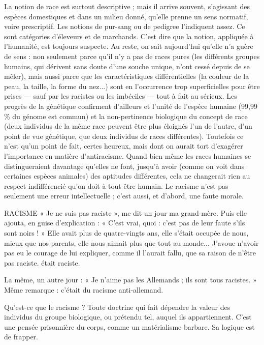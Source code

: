 La notion de race est surtout descriptive ; mais il arrive souvent, s'agissant
des espèces domestiques et dans un milieu donné, qu’elle prenne un sens normatif,
voire prescriptif. Les notions de pur-sang ou de pedigree l’indiquent
assez. Ce sont catégories d’éleveurs et de marchands. C’est dire que la notion,
appliquée à l'humanité, est toujours suspecte. Au reste, on sait aujourd’hui
qu’elle n’a guère de sens : non seulement parce qu’il n’y a pas de races pures (les
différents groupes humains, qui dérivent sans doute d’une souche unique,
n'ont cessé depuis de se mêler), mais aussi parce que les caractéristiques différentielles
(la couleur de la peau, la taille, la forme du nez...) sont en l’occurrence
trop superficielles pour être prises — sauf par les racistes ou les imbéciles
— tout à fait au sérieux. Les progrès de la génétique confirment d’ailleurs et
l'unité de l’espèce humaine (99,99 \% du génome est commun) et la non-pertinence
biologique du concept de race (deux individus de la même race peuvent
être plus éloignés l’un de l’autre, d’un point de vue génétique, que deux individus
de races différentes). Toutefois ce n’est qu'un point de fait, certes heureux,
mais dont on aurait tort d’exagérer l'importance en matière d’antiracisme.
Quand bien même les races humaines se distingueraient davantage
qu'elles ne font, jusqu’à avoir (comme on voit dans certaines espèces animales)
des aptitudes différentes, cela ne changerait rien au respect indifférencié qu’on
doit à tout être humain. Le racisme n’est pas seulement une erreur
intellectuelle ; c’est aussi, et d’abord, une faute morale.

RACISME  « Je ne suis pas raciste », me dit un jour ma grand-mère. Puis elle
ajouta, en guise d’explication : « C’est vrai, quoi : c’est pas de leur
faute s’ils sont noirs ! » Elle avait plus de quatre-vingts ans, elle s'était occupée
de nous, mieux que nos parents, elle nous aimait plus que tout au monde...
J'avoue n’avoir pas eu le courage de lui expliquer, comme il l'aurait fallu, que
sa raison de n’être pas raciste. était raciste.

La même, un autre jour : « Je n’aime pas les Allemands ; ils sont tous
racistes. » Même remarque : c'était du racisme anti-allemand.

Qu'est-ce que le racisme ? Toute doctrine qui fait dépendre la valeur des
individus du groupe biologique, ou prétendu tel, auquel ils appartiennent.
C’est une pensée prisonnière du corps, comme un matérialisme barbare. Sa
logique est de frapper.

